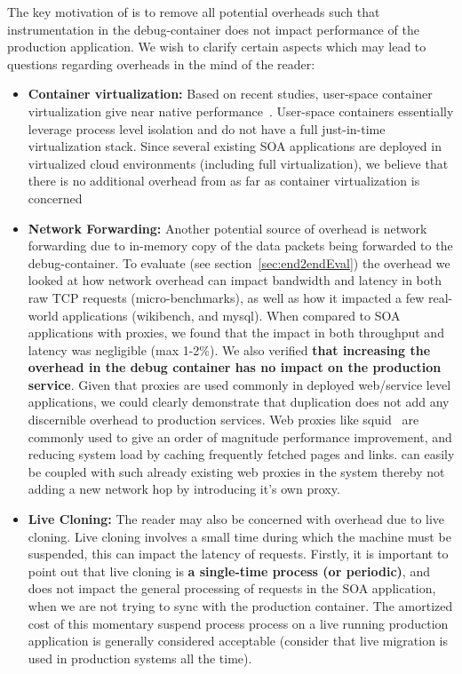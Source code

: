 The key motivation of \parikshan is to remove all potential overheads such that instrumentation in the debug-container does not impact performance of the production application.
We wish to clarify certain aspects which may lead to questions regarding overheads in the mind of the reader:
\begin{itemize}
	\item \textbf{Container virtualization:} Based on recent studies, user-space container virtualization give near native performance~\cite{performanceComparisonlxcVM,performanceEvalContainers}. 
	User-space containers essentially leverage process level isolation and do not have a full just-in-time virtualization stack.
	Since several existing SOA applications are deployed in virtualized cloud environments (including full virtualization), we believe that there is no additional overhead from \parikshan as far as container virtualization is concerned
	
	\item \textbf{Network Forwarding:} 
	Another potential source of overhead is network forwarding due to in-memory copy of the data packets being forwarded to the debug-container. 
	To evaluate (see section~\ref{sec:end2endEval}) the overhead we looked at how network overhead can impact bandwidth and latency in both raw TCP requests (micro-benchmarks), as well as how it impacted a few real-world applications (wikibench, and mysql).
	When compared to SOA applications with proxies, we found that the impact in both throughput and latency was negligible (max 1-2\%).
	We also verified \textbf{that increasing the overhead in the debug container has no impact on the production service}. 
	Given that proxies are used commonly in deployed web/service level applications, we could clearly demonstrate that duplication does not add any discernible overhead to production services. 
	Web proxies like squid~\cite{squid} are commonly used to give an order of magnitude performance improvement, and reducing system load by caching frequently fetched pages and links.
	\parikshan can easily be coupled with such already existing web proxies in the system thereby not adding a new network hop by introducing it's own proxy.
	
	\item \textbf{Live Cloning:}
	The reader may also be concerned with overhead due to live cloning.
	Live cloning involves a small time during which the machine must be suspended, this can impact the latency of requests.
	Firstly, it is important to point out that live cloning is \textbf{a single-time process (or periodic)}, and does not impact the general processing of requests in the SOA application, when we are not trying to sync with the production container.   
	The amortized cost of this momentary suspend process process on a live running production application is generally considered acceptable (consider that live migration is used in production systems all the time).
	

\end{itemize}
